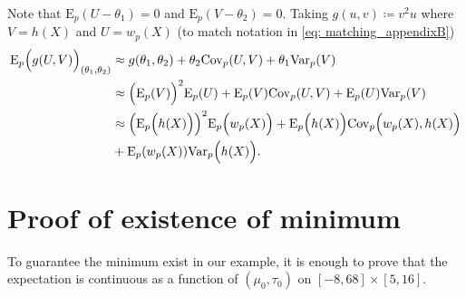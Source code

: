\documentclass{amsart}
\newcommand{\Var}{\mathrm{Var}}
\theoremstyle{plain}%
\begin{document}
Note that $\mathrm{E}_p(U - \theta_1) = 0$ and $\mathrm{E}_p(V - \theta_2) = 0$. 
Taking $g(u,v)\coloneqq v^2 u$ where $V = h(X)$ and $U = w_p(X)$ (to match notation in \cref{eq: matching_appendixB})  
\begin{align}
\mathrm{E}_p\Bigl(g(U,V)\Bigr)_{(\theta_1,\theta_2)} & \approx g(\theta_1,\theta_2) + \theta_2 \mathrm{Cov}_p(U,V) +  \theta_1 \Var_p(V) \nonumber \\
 & \approx \Bigl(\mathrm{E}_p(V)\Bigr)^2 \mathrm{E}_p(U) + \mathrm{E}_p(V) \mathrm{Cov}_p(U,V) +  \mathrm{E}_p(U) \Var_p(V)   \\
 & \approx \Bigl(\mathrm{E}_p\Bigl(h(X)\Bigr)\Bigr)^2 \mathrm{E}_p\Bigl(w_p(X)\Bigr) + \mathrm{E}_p\Bigl(h(X)\Bigr) \mathrm{Cov}_p\Bigl(w_p(X),h(X)\Bigr)  \nonumber \\
 & +  \mathrm{E}_p(w_p(X)) \Var_p\Bigl(h(X)\Bigr). 
\end{align}

\section{Proof of existence of minimum} \label{proof_minimum}

To guarantee the minimum exist in our example, it is enough to prove that the expectation is 
continuous as a function of $(\mu_0, \tau_0)$ on $[-8,68] \times [5,16]$.
\end{document}
